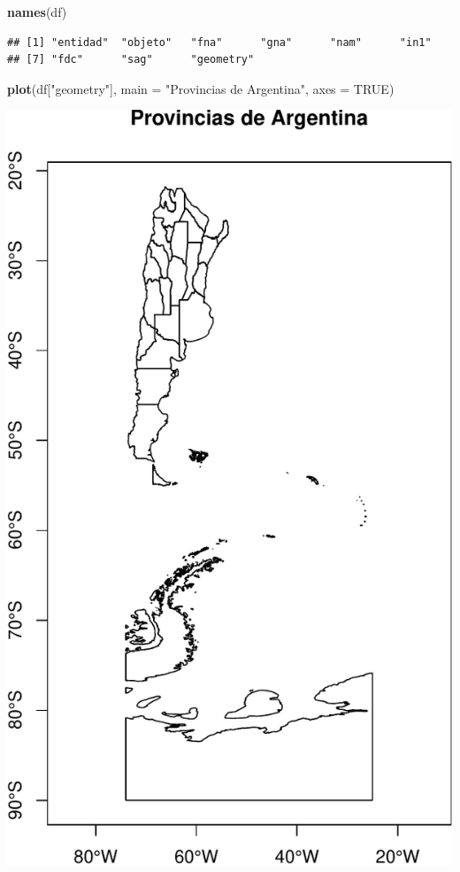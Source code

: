 \documentclass[]{book}
\newenvironment{Shaded}{\begin{snugshade}}{\end{snugshade}}
\newcommand{\DataTypeTok}[1]{\textcolor[rgb]{0.13,0.29,0.53}{#1}}
\newcommand{\KeywordTok}[1]{\textcolor[rgb]{0.13,0.29,0.53}{\textbf{#1}}}
\newcommand{\NormalTok}[1]{#1}
\newcommand{\OtherTok}[1]{\textcolor[rgb]{0.56,0.35,0.01}{#1}}
\newcommand{\StringTok}[1]{\textcolor[rgb]{0.31,0.60,0.02}{#1}}
\begin{document}
\begin{Shaded}
\begin{Highlighting}[]
\KeywordTok{names}\NormalTok{(df)}
\end{Highlighting}
\end{Shaded}

\begin{verbatim}
## [1] "entidad"  "objeto"   "fna"      "gna"      "nam"      "in1"     
## [7] "fdc"      "sag"      "geometry"
\end{verbatim}

\begin{Shaded}
\begin{Highlighting}[]
\KeywordTok{plot}\NormalTok{(df[}\StringTok{"geometry"}\NormalTok{], }
     \DataTypeTok{main =} \StringTok{"Provincias de Argentina"}\NormalTok{,}
     \DataTypeTok{axes =} \OtherTok{TRUE}\NormalTok{)}
\end{Highlighting}
\end{Shaded}

\includegraphics{bookdown-demo_files/figure-latex/unnamed-chunk-42-1.pdf}
\end{document}
